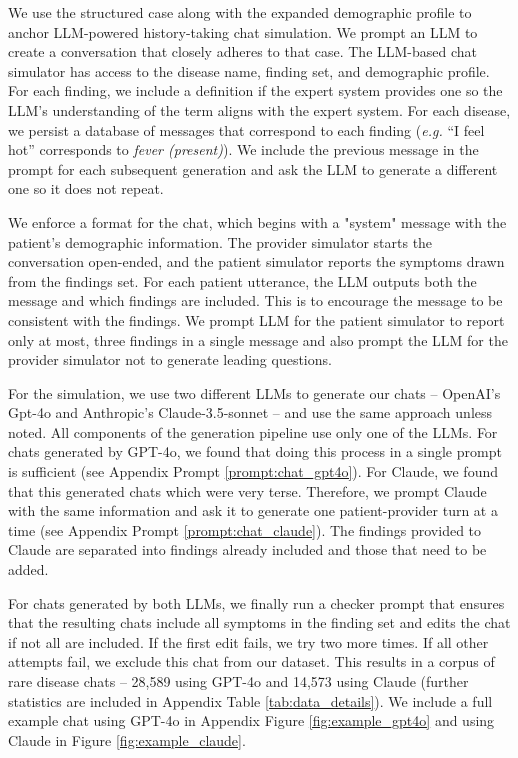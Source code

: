 We use the structured case along with the expanded demographic profile to anchor LLM-powered history-taking chat simulation. We prompt an LLM to create a conversation that closely adheres to that case.
The LLM-based chat simulator has access to the disease name, finding set, and demographic profile.  For each finding, we include a definition if the expert system provides one so the LLM's understanding of the term aligns with the expert system.  For each disease, we persist a database of messages that correspond to each finding (\textit{e.g.} ``I feel hot'' corresponds to \textit{fever (present)}). We include the previous message in the prompt for each subsequent generation and ask the LLM to generate a different one so it does not repeat.

We enforce a format for the chat, which begins with a "system" message with the patient's demographic information. The provider simulator starts the conversation open-ended, and the patient simulator reports the symptoms drawn from the findings set. For each patient utterance, the LLM outputs both the message and which findings are included.  This is to encourage the message to be consistent with the findings. We prompt LLM  for the patient simulator to report only at most, three findings 
in a single message and also prompt the LLM  for the provider simulator not to generate leading questions.

For the simulation, we use two different LLMs to generate our chats -- OpenAI's Gpt-4o and Anthropic's Claude-3.5-sonnet -- and use the same approach unless noted.  All components of the generation pipeline use only one of the LLMs. For chats generated by GPT-4o, we found that doing this process in a single prompt is sufficient (see Appendix Prompt \ref{prompt:chat_gpt4o}).  For Claude, we found that this generated chats which were very terse.  Therefore, we prompt Claude with the same information and ask it to generate one patient-provider turn at a time  (see Appendix Prompt \ref{prompt:chat_claude}).  The findings provided to Claude are separated into findings already included and those that need to be added.  

For chats generated by both LLMs, we finally run a checker prompt that ensures that the resulting chats include all symptoms in the finding set and edits the chat if not all are included.  If the first edit fails, we try two more times.  If all other attempts fail, we exclude this chat from our dataset.  This results in a corpus of rare disease chats -- 28,589 using GPT-4o and 14,573 using Claude (further statistics are included in Appendix Table \ref{tab:data_details}).  We include a full example chat using GPT-4o in Appendix Figure \ref{fig:example_gpt4o} and using Claude in Figure \ref{fig:example_claude}. 
